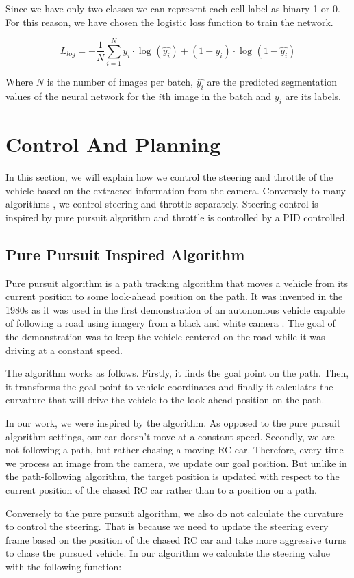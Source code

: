 Since we have only two classes we can represent each cell label as binary 1 or 0. For this reason, we have chosen the logistic loss function to train the network. \par

\begin{equation}
L_{log} = -\dfrac{1}{N} \sum_{i=1}^{N} y_i \cdot \log_{} (\hat{y_i}) + (1 - y_i) \cdot \log_{} (1-\hat{y_i})
\end{equation}

Where $N$ is the number of images per batch, $\hat{y_i}$ are the predicted segmentation values of the neural network for the $i$th image in the batch and $y_i$ are its labels. 




\section{Control And Planning}
In this section, we will explain how we control the steering and throttle of the vehicle based on the extracted information from the camera. Conversely to many algorithms \cite{Broggi2013}\cite{Werling2010}, we control steering and throttle separately. Steering control is inspired by pure pursuit algorithm and throttle is controlled by a PID controlled.


\subsection{Pure Pursuit Inspired Algorithm} \label{sec:pure_pursuit}
Pure pursuit algorithm is a path tracking algorithm that moves a vehicle from its current position to some look-ahead position on the path. It was invented in the 1980s as it was used in the first demonstration of an autonomous vehicle capable of following a road using imagery from a black and white camera \cite{pure_pursuit_orig}. The goal of the demonstration was to keep the vehicle centered on the road while it was driving at a constant speed.\par


The algorithm works as follows. Firstly, it finds the goal point on the path. Then, it transforms the goal point to vehicle coordinates and finally it calculates the curvature that will drive the vehicle to the look-ahead position on the path. \par


In our work, we were inspired by the algorithm. As opposed to the pure pursuit algorithm settings, our car doesn't move at a constant speed. Secondly, we are not following a path, but rather chasing a moving RC car. Therefore, every time we process an image from the camera, we update our goal position. But unlike in the path-following algorithm, the target position is updated with respect to the current position of the chased RC car rather than to a position on a path. \par
Conversely to the pure pursuit algorithm, we also do not calculate the curvature to control the steering. That is because we need to update the steering every frame based on the position of the chased RC car and take more aggressive turns to chase the pursued vehicle. In our algorithm we calculate the steering value with the following function:

